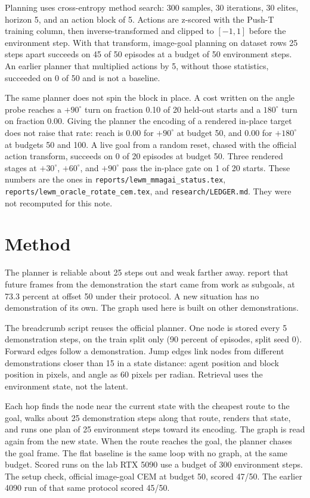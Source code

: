 \documentclass[11pt,a4paper]{article}
\begin{document}
Planning uses cross-entropy method search: 300 samples, 30 iterations, 30 elites, horizon 5, and an action block of 5.
Actions are z-scored with the Push-T training column, then inverse-transformed and clipped to $[-1,1]$ before the environment step.
With that transform, image-goal planning on dataset rows 25 steps apart succeeds on 45 of 50 episodes at a budget of 50 environment steps.
An earlier planner that multiplied actions by 5, without those statistics, succeeded on 0 of 50 and is not a baseline.

The same planner does not spin the block in place.
A cost written on the angle probe reaches a $+90^{\circ}$ turn on fraction 0.10 of 20 held-out starts and a $180^{\circ}$ turn on fraction 0.00.
Giving the planner the encoding of a rendered in-place target does not raise that rate: reach is 0.00 for $+90^{\circ}$ at budget 50, and 0.00 for $+180^{\circ}$ at budgets 50 and 100.
A live goal from a random reset, chased with the official action transform, succeeds on 0 of 20 episodes at budget 50.
Three rendered stages at $+30^{\circ}$, $+60^{\circ}$, and $+90^{\circ}$ pass the in-place gate on 1 of 20 starts.
These numbers are the ones in \texttt{reports/lewm\_mmagai\_status.tex}, \texttt{reports/lewm\_oracle\_rotate\_cem.tex}, and \texttt{research/LEDGER.md}.
They were not recomputed for this note.

\section{Method}
The planner is reliable about 25 steps out and weak farther away.
\citet{caselli2026hilewm} report that future frames from the demonstration the start came from work as subgoals, at 73.3 percent at offset 50 under their protocol.
A new situation has no demonstration of its own.
The graph used here is built on other demonstrations.

The breadcrumb script reuses the official planner.
One node is stored every 5 demonstration steps, on the train split only (90 percent of episodes, split seed 0).
Forward edges follow a demonstration.
Jump edges link nodes from different demonstrations closer than 15 in a state distance: agent position and block position in pixels, and angle as 60 pixels per radian.
Retrieval uses the environment state, not the latent.

Each hop finds the node near the current state with the cheapest route to the goal, walks about 25 demonstration steps along that route, renders that state, and runs one plan of 25 environment steps toward its encoding.
The graph is read again from the new state.
When the route reaches the goal, the planner chases the goal frame.
The flat baseline is the same loop with no graph, at the same budget.
Scored runs on the lab RTX 5090 use a budget of 300 environment steps.
The setup check, official image-goal CEM at budget 50, scored 47/50.
The earlier 4090 run of that same protocol scored 45/50.
\end{document}
